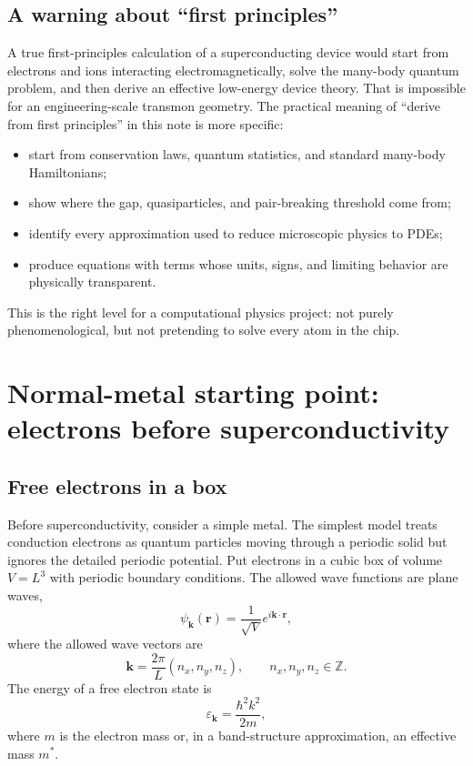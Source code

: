 \documentclass[11pt]{article}
\newcommand{\bk}{{\bm{k}}}
\newcommand{\br}{{\bm{r}}}
\newcommand{\eps}{\varepsilon}
\begin{document}
\subsection{A warning about ``first principles''}
A true first-principles calculation of a superconducting device would start from electrons and ions interacting electromagnetically, solve the many-body quantum problem, and then derive an effective low-energy device theory. That is impossible for an engineering-scale transmon geometry. The practical meaning of ``derive from first principles'' in this note is more specific:
\begin{itemize}[leftmargin=1.6em]
    \item start from conservation laws, quantum statistics, and standard many-body Hamiltonians;
    \item show where the gap, quasiparticles, and pair-breaking threshold come from;
    \item identify every approximation used to reduce microscopic physics to PDEs;
    \item produce equations with terms whose units, signs, and limiting behavior are physically transparent.
\end{itemize}
This is the right level for a computational physics project: not purely phenomenological, but not pretending to solve every atom in the chip.

\section{Normal-metal starting point: electrons before superconductivity}

\subsection{Free electrons in a box}
Before superconductivity, consider a simple metal. The simplest model treats conduction electrons as quantum particles moving through a periodic solid but ignores the detailed periodic potential. Put electrons in a cubic box of volume $V=L^3$ with periodic boundary conditions. The allowed wave functions are plane waves,
\begin{equation}
\psi_{\bk}(\br)=\frac{1}{\sqrt{V}}e^{i\bk\cdot\br},
\end{equation}
where the allowed wave vectors are
\begin{equation}
\bk=\frac{2\pi}{L}(n_x,n_y,n_z),\qquad n_x,n_y,n_z\in\mathbb{Z}.
\end{equation}
The energy of a free electron state is
\begin{equation}
\eps_{\bk}=\frac{\hbar^2 k^2}{2m},
\end{equation}
where $m$ is the electron mass or, in a band-structure approximation, an effective mass $m^*$.
\end{document}
